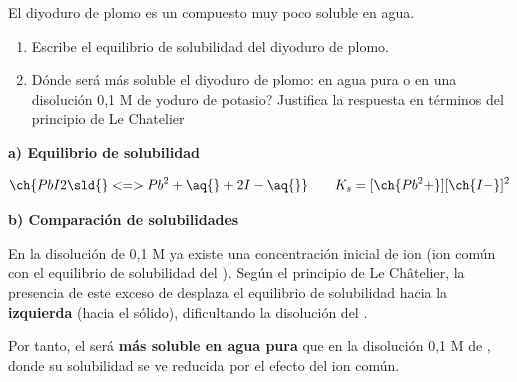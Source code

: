\begin{exerciseEVAU}
    El diyoduro de plomo es un compuesto muy poco soluble en agua.
    \begin{enumerate}[label=\letraminuscula]
\item Escribe el equilibrio de solubilidad del diyoduro de plomo.
\item Dónde será más soluble el diyoduro de plomo: en agua pura o en una disolución 0,1 M de yoduro de potasio? Justifica la respuesta en términos del principio de Le Chatelier
    \end{enumerate}

    \begin{solu}

        \textbf{a) Equilibrio de solubilidad}

        \begin{equation*}
            \ch{PbI2 \sld{} <=> Pb^2+ \aq{} + 2 I- \aq{}} \qquad K_s = [\ch{Pb^2+}][\ch{I-}]^2
        \end{equation*}

        \textbf{b) Comparación de solubilidades}

        En la disolución de  0,1 M ya existe una concentración inicial de ion  (ion común con el equilibrio de solubilidad del ). Según el principio de Le Châtelier, la presencia de este exceso de  desplaza el equilibrio de solubilidad hacia la \textbf{izquierda} (hacia el sólido), dificultando la disolución del .

        Por tanto, el  será \textbf{más soluble en agua pura} que en la disolución 0,1 M de , donde su solubilidad se ve reducida por el efecto del ion común.

    \end{solu}

\end{exerciseEVAU}


